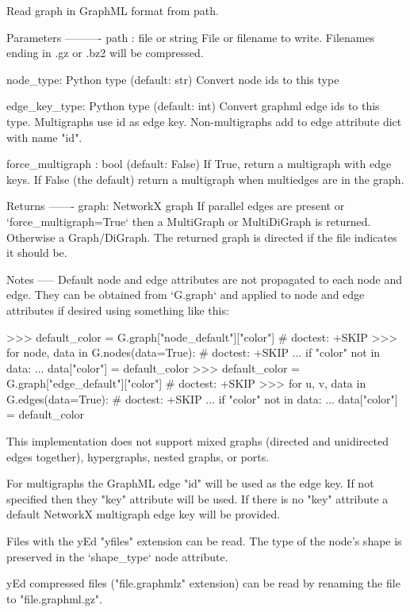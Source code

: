 \begin{DoxyVerb}Read graph in GraphML format from path.

Parameters
----------
path : file or string
   File or filename to write.
   Filenames ending in .gz or .bz2 will be compressed.

node_type: Python type (default: str)
   Convert node ids to this type

edge_key_type: Python type (default: int)
   Convert graphml edge ids to this type. Multigraphs use id as edge key.
   Non-multigraphs add to edge attribute dict with name "id".

force_multigraph : bool (default: False)
   If True, return a multigraph with edge keys. If False (the default)
   return a multigraph when multiedges are in the graph.

Returns
-------
graph: NetworkX graph
    If parallel edges are present or `force_multigraph=True` then
    a MultiGraph or MultiDiGraph is returned. Otherwise a Graph/DiGraph.
    The returned graph is directed if the file indicates it should be.

Notes
-----
Default node and edge attributes are not propagated to each node and edge.
They can be obtained from `G.graph` and applied to node and edge attributes
if desired using something like this:

>>> default_color = G.graph["node_default"]["color"]  # doctest: +SKIP
>>> for node, data in G.nodes(data=True):  # doctest: +SKIP
...     if "color" not in data:
...         data["color"] = default_color
>>> default_color = G.graph["edge_default"]["color"]  # doctest: +SKIP
>>> for u, v, data in G.edges(data=True):  # doctest: +SKIP
...     if "color" not in data:
...         data["color"] = default_color

This implementation does not support mixed graphs (directed and unidirected
edges together), hypergraphs, nested graphs, or ports.

For multigraphs the GraphML edge "id" will be used as the edge
key.  If not specified then they "key" attribute will be used.  If
there is no "key" attribute a default NetworkX multigraph edge key
will be provided.

Files with the yEd "yfiles" extension can be read. The type of the node's
shape is preserved in the `shape_type` node attribute.

yEd compressed files ("file.graphmlz" extension) can be read by renaming
the file to "file.graphml.gz".\end{DoxyVerb}
 \mbox{\label{namespacenetworkx_1_1readwrite_1_1graphml_aa2b8982d923038f1e66ce2863daa637f}} 
